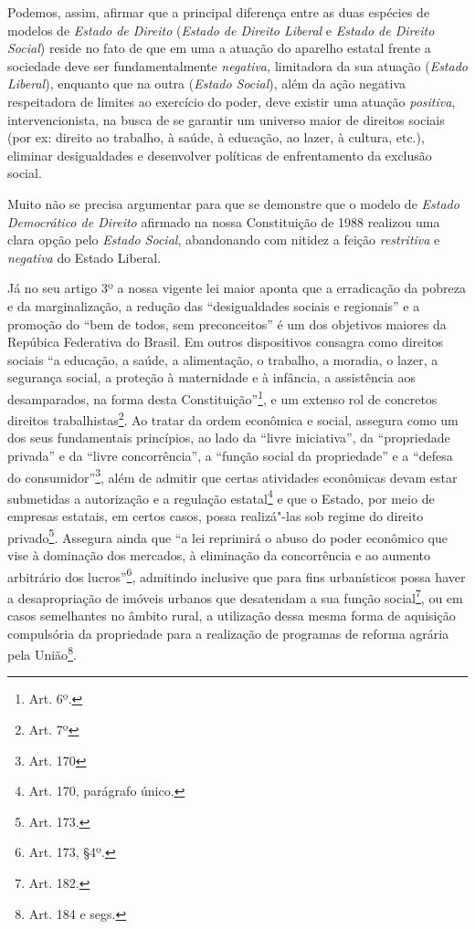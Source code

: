 Podemos, assim, afirmar que a principal diferença entre as duas espécies
de modelos de \emph{Estado de Direito} (\emph{Estado de Direito Liberal}
e \emph{Estado de Direito Social}) reside no fato de que em uma a
atuação do aparelho estatal frente a sociedade deve ser fundamentalmente
\emph{negativa,} limitadora da sua atuação (\emph{Estado Liberal}),
enquanto que na outra (\emph{Estado Social}), além da ação negativa
respeitadora de limites ao exercício do poder, deve existir uma atuação
\emph{positiva}, intervencionista, na busca de se garantir um universo
maior de direitos sociais (por ex: direito ao trabalho, à saúde, à
educação, ao lazer, à cultura, etc.), eliminar desigualdades e
desenvolver políticas de enfrentamento da exclusão social.

Muito não se precisa argumentar para que se demonstre que o modelo de
\emph{Estado Democrático de Direito} afirmado na nossa Constituição de
1988 realizou uma clara opção pelo \emph{Estado Social}, abandonando
com nitidez a feição \emph{restritiva} e \emph{negativa} do Estado
Liberal.

Já no seu artigo 3º a nossa vigente lei maior aponta que a erradicação
da pobreza e da marginalização, a redução das ``desigualdades
sociais e regionais'' e a promoção do ``bem de todos, sem
preconceitos'' é um dos objetivos maiores da Repúbica Federativa do
Brasil. Em outros dispositivos consagra como direitos sociais ``a
educação, a saúde, a alimentação, o trabalho, a moradia, o lazer, a
segurança social, a proteção à maternidade e à infância, a assistência
aos desamparados, na forma desta Constituição''\footnote{Art. 6º.}, e
um extenso rol de concretos direitos trabalhistas\footnote{Art. 7º}. Ao
tratar da ordem econômica e social, assegura como um dos seus
fundamentais princípios, ao lado da ``livre iniciativa'', da
``propriedade privada'' e da ``livre concorrência'', a
``função social da propriedade'' e a ``defesa do
consumidor''\footnote{Art. 170}, além de admitir que certas atividades
econômicas devam estar submetidas a autorização e a regulação
estatal\footnote{Art. 170, parágrafo único.} e que o Estado, por meio de
empresas estatais, em certos casos, possa realizá"-las sob regime do
direito privado\footnote{Art. 173.}. Assegura ainda que ``a lei
reprimirá o abuso do poder econômico que vise à dominação dos mercados,
à eliminação da concorrência e ao aumento arbitrário dos
lucros''\footnote{Art. 173, §4º.}, admitindo inclusive que para
fins urbanísticos possa haver a desapropriação de imóveis urbanos que
desatendam a sua função social\footnote{Art. 182.}, ou em casos
semelhantes no âmbito rural, a utilização dessa mesma forma de aquisição
compulsória da propriedade para a realização de programas de reforma
agrária pela União\footnote{Art. 184 e segs.}.

